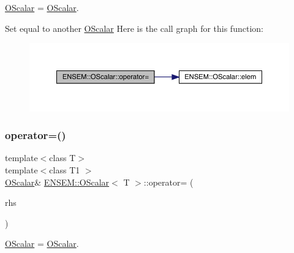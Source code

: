 \mbox{\hyperlink{classENSEM_1_1OScalar}{O\+Scalar}} = \mbox{\hyperlink{classENSEM_1_1OScalar}{O\+Scalar}}. 

Set equal to another \mbox{\hyperlink{classENSEM_1_1OScalar}{O\+Scalar}} Here is the call graph for this function\+:
\nopagebreak
\begin{figure}[H]
\begin{center}
\leavevmode
\includegraphics[width=350pt]{da/d80/classENSEM_1_1OScalar_a7c36649387edf21f3fa19f9ae63d4aca_cgraph}
\end{center}
\end{figure}
\mbox{\label{classENSEM_1_1OScalar_aa6400023b45eed547bcb84c395fa1520}} 
\subsubsection{\texorpdfstring{operator=()}{operator=()}\hspace{0.1cm}{\footnotesize\ttfamily [7/8]}}
{\footnotesize\ttfamily template$<$class T$>$ \\
template$<$class T1 $>$ \\
\mbox{\hyperlink{classENSEM_1_1OScalar}{O\+Scalar}}\& \mbox{\hyperlink{classENSEM_1_1OScalar}{E\+N\+S\+E\+M\+::\+O\+Scalar}}$<$ T $>$\+::operator= (\begin{DoxyParamCaption}\item[{const \mbox{\hyperlink{classENSEM_1_1OScalar}{O\+Scalar}}$<$ T1 $>$ \&}]{rhs }\end{DoxyParamCaption})\hspace{0.3cm}{\ttfamily [inline]}}



\mbox{\hyperlink{classENSEM_1_1OScalar}{O\+Scalar}} = \mbox{\hyperlink{classENSEM_1_1OScalar}{O\+Scalar}}. 

